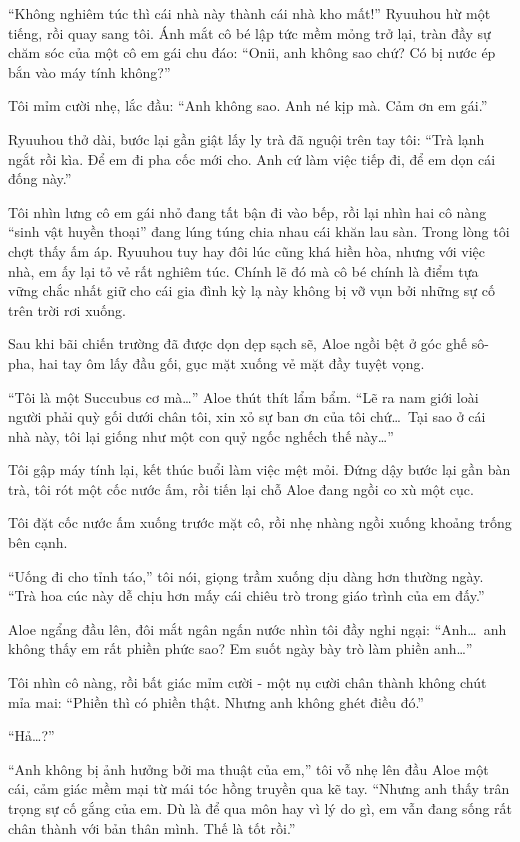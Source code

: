 \documentclass[../main.tex]{subfiles}
\begin{document}
``Không nghiêm túc thì cái nhà này thành cái nhà kho mất!'' Ryuuhou hừ một tiếng, rồi quay sang tôi. Ánh mắt cô bé lập tức mềm mỏng trở lại, tràn đầy sự chăm sóc của một cô em gái chu đáo: ``Onii, anh không sao chứ? Có bị nước ép bắn vào máy tính không?''

Tôi mỉm cười nhẹ, lắc đầu: ``Anh không sao. Anh né kịp mà. Cảm ơn em gái.''

Ryuuhou thở dài, bước lại gần giật lấy ly trà đã nguội trên tay tôi: ``Trà lạnh ngắt rồi kìa. Để em đi pha cốc mới cho. Anh cứ làm việc tiếp đi, để em dọn cái đống này.''

Tôi nhìn lưng cô em gái nhỏ đang tất bận đi vào bếp, rồi lại nhìn hai cô nàng ``sinh vật huyền thoại'' đang lúng túng chia nhau cái khăn lau sàn. Trong lòng tôi chợt thấy ấm áp. Ryuuhou tuy hay đôi lúc cũng khá hiền hòa, nhưng với việc nhà, em ấy lại tỏ vẻ rất nghiêm túc. Chính lẽ đó mà cô bé chính là điểm tựa vững chắc nhất giữ cho cái gia đình kỳ lạ này không bị vỡ vụn bởi những sự cố trên trời rơi xuống.

\ct

Sau khi bãi chiến trường đã được dọn dẹp sạch sẽ, Aloe ngồi bệt ở góc ghế sô-pha, hai tay ôm lấy đầu gối, gục mặt xuống vẻ mặt đầy tuyệt vọng.

``Tôi là một Succubus cơ mà\dots'' Aloe thút thít lẩm bẩm. ``Lẽ ra nam giới loài người phải quỳ gối dưới chân tôi, xin xỏ sự ban ơn của tôi chứ\dots\ Tại sao ở cái nhà này, tôi lại giống như một con quỷ ngốc nghếch thế này\dots''

Tôi gập máy tính lại, kết thúc buổi làm việc mệt mỏi. Đứng dậy bước lại gần bàn trà, tôi rót một cốc nước ấm, rồi tiến lại chỗ Aloe đang ngồi co xù một cục.

Tôi đặt cốc nước ấm xuống trước mặt cô, rồi nhẹ nhàng ngồi xuống khoảng trống bên cạnh.

``Uống đi cho tỉnh táo,'' tôi nói, giọng trầm xuống dịu dàng hơn thường ngày. ``Trà hoa cúc này dễ chịu hơn mấy cái chiêu trò trong giáo trình của em đấy.''

Aloe ngẩng đầu lên, đôi mắt ngân ngấn nước nhìn tôi đầy nghi ngại: ``Anh\dots\ anh không thấy em rất phiền phức sao? Em suốt ngày bày trò làm phiền anh\dots''

Tôi nhìn cô nàng, rồi bất giác mỉm cười - một nụ cười chân thành không chút mỉa mai: ``Phiền thì có phiền thật. Nhưng anh không ghét điều đó.''

``Hả\dots?''

``Anh không bị ảnh hưởng bởi ma thuật của em,'' tôi vỗ nhẹ lên đầu Aloe một cái, cảm giác mềm mại từ mái tóc hồng truyền qua kẽ tay. ``Nhưng anh thấy trân trọng sự cố gắng của em. Dù là để qua môn hay vì lý do gì, em vẫn đang sống rất chân thành với bản thân mình. Thế là tốt rồi.''
\end{document}
